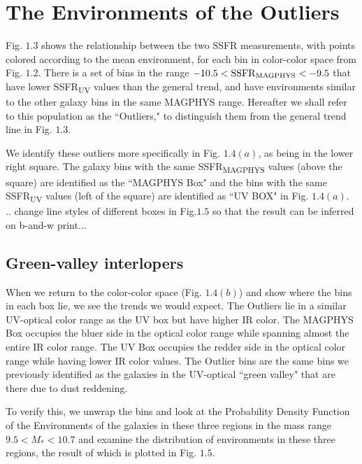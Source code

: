 \section{The Environments of the Outliers}
\label{ch1_results}
Fig. $1.3$ shows the relationship between the two SSFR measurements,
with points colored according to the mean environment, for each bin 
in color-color space from Fig. $1.2$. There is a set of bins in 
the range $-10.5 < \mathrm{SSFR\textsubscript{MAGPHYS}}< -9.5$ that 
have lower SSFR\textsubscript{UV} values than the general trend, 
and have environments similar to the other galaxy bins in the same 
MAGPHYS range. Hereafter we shall refer to this population as the 
``Outliers," to distinguish them from the general trend line in 
Fig. $1.3$. 

We identify these outliers more specifically in Fig. $1.4(a)$, as 
being in the lower right square. The galaxy bins with the same 
SSFR\textsubscript{MAGPHYS} values (above the square) are identified 
as the ``MAGPHYS Box" and the bins with the same SSFR\textsubscript{UV} 
values (left of the square) are identified as ``UV BOX" in Fig. 
$1.4(a)$. \\

.. change line styles of different boxes in Fig.$1.5$ so that the result can be inferred on b-and-w print...
  
\subsection{Green-valley interlopers}

When we return to the color-color space (Fig. $1.4(b)$) and 
show where the bins in each box lie, we see the trends we would expect. 
The Outliers lie in a similar UV-optical color range as the UV box but 
have higher IR color. The MAGPHYS Box occupies the bluer side 
in the optical color range while spanning almost the entire IR 
color range. The UV Box occupies the redder side in the optical 
color range while having lower IR color values. The Outlier bins 
are the same bins we previously identified as the galaxies in the 
UV-optical ``green valley" that are there due to dust reddening. 

To verify this, we unwrap the bins and look at the Probability 
Density Function of the Environments of the galaxies in these three regions in the mass range  $ 9.5 < M_{*} < 10.7$ and examine the distribution of environments in these three regions, the result of which is plotted in Fig. $1.5$.

